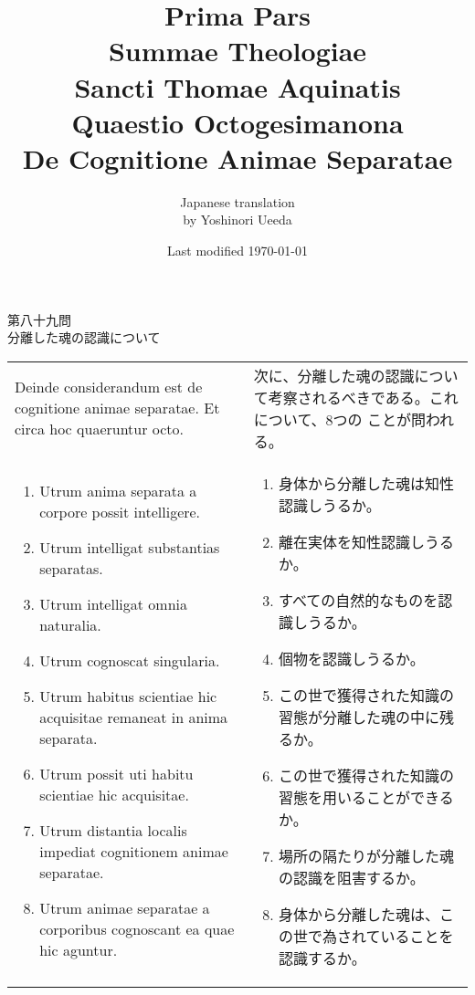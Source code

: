 \documentclass[10pt]{jsarticle} %
\title{{\bf Prima Pars}\\{\HUGE Summae Theologiae}\\Sancti Thomae
Aquinatis\\{\sffamily Quaestio Octogesimanona}\\{\bf De Cognitione Animae Separatae}}
\author{Japanese translation\\by Yoshinori {\sc Ueeda}}
\date{Last modified \today}
\begin{document}
\maketitle

\begin{center}
{\Large 第八十九問\\
分離した魂の認識について}
\end{center}


\begin{longtable}{p{21em}p{21em}}
Deinde considerandum est de cognitione animae separatae. Et circa hoc
quaeruntur octo.
 
&

 次に、分離した魂の認識について考察されるべきである。これについて、8つの
 ことが問われる。
\\

\begin{enumerate}
 \item Utrum anima separata a corpore possit
intelligere.
 \item Utrum intelligat substantias separatas. 
 \item Utrum intelligat omnia naturalia. 
 \item Utrum cognoscat
singularia. 
 \item Utrum habitus scientiae hic acquisitae remaneat in
anima separata. 
 \item Utrum possit uti habitu scientiae hic
acquisitae. 
 \item Utrum distantia localis impediat cognitionem animae
separatae. 
 \item Utrum animae separatae a corporibus cognoscant ea
quae hic aguntur.
\end{enumerate}

&

\begin{enumerate}
 \item 身体から分離した魂は知性認識しうるか。
 \vspace{4ex}
 \item 離在実体を知性認識しうるか。
 \item すべての自然的なものを認識しうるか。
 \item 個物を認識しうるか。
 \item この世で獲得された知識の習態が分離した魂の中に残るか。
 \item この世で獲得された知識の習態を用いることができるか。
 \item 場所の隔たりが分離した魂の認識を阻害するか。
 \item 身体から分離した魂は、この世で為されていることを認識するか。
\end{enumerate}

\end{longtable}
\end{document}
